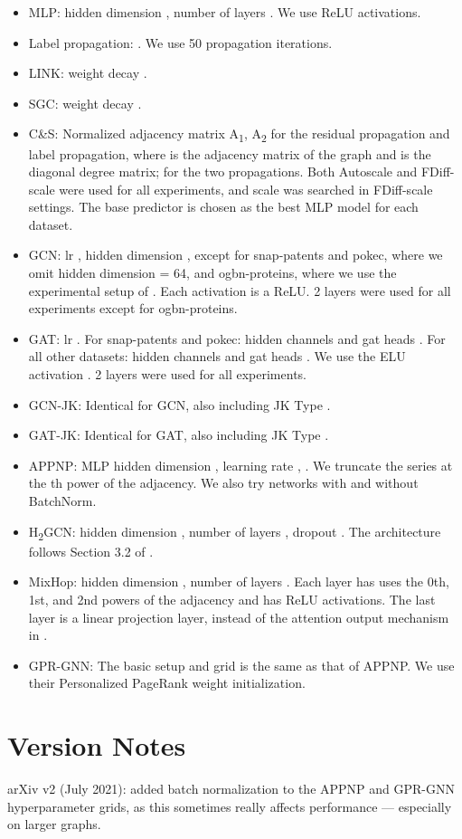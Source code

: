 \documentclass[sigconf, balance=false]{acmart}
\begin{document}
\begin{itemize}
    \item MLP: hidden dimension , number of layers . We use ReLU activations.
    \item Label propagation: . We use 50 propagation iterations.
    \item LINK: weight decay .
    \item SGC: weight decay .
    \item C\&S: Normalized adjacency matrix A\textsubscript{1}, A\textsubscript{2}  for the residual propagation and label propagation, where  is the adjacency matrix of the graph and  is the diagonal degree matrix;  for the two propagations. Both Autoscale and FDiff-scale were used for all experiments, and scale  was searched in FDiff-scale settings. The base predictor is chosen as the best MLP model for each dataset.
    \item GCN: lr , hidden dimension , except for snap-patents and pokec, where we omit hidden dimension = 64, and ogbn-proteins, where we use the experimental setup of \citet{hu2020open}. Each activation is a ReLU. 2 layers were used for all experiments except for ogbn-proteins.
    \item GAT: lr . For snap-patents and pokec: hidden channels  and gat heads . For all other datasets: hidden channels  and gat heads . We use the ELU activation \cite{clevert2015fast}. 2 layers were used for all experiments. 
    \item GCN-JK: Identical for GCN, also including JK Type .
    \item GAT-JK: Identical for GAT, also including JK Type . 
    \item APPNP: MLP hidden dimension , learning rate , . We truncate the series at the th power of the adjacency. We also try networks with and without BatchNorm.
    \item H\textsubscript{2}GCN: hidden dimension , number of layers , dropout . The architecture follows Section 3.2 of \cite{zhu2020beyond}.
    \item MixHop: hidden dimension , number of layers . Each layer has uses the 0th, 1st, and 2nd powers of the adjacency and has ReLU activations. The last layer is a linear projection layer, instead of the attention output mechanism in \cite{abu2019mixhop}.
    \item GPR-GNN: The basic setup and grid is the same as that of APPNP. We use their Personalized PageRank weight initialization.
\end{itemize}

\section*{Version Notes}

arXiv v2 (July 2021): added batch normalization to the APPNP and GPR-GNN hyperparameter grids, as this sometimes really affects performance --- especially on larger graphs.
\end{document}
